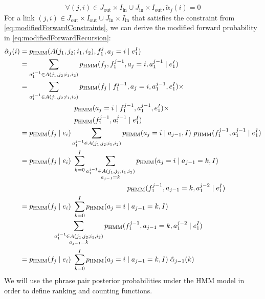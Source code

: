 %
\begin{equation}
  \forall (j, i) \in J_{\text{out}} \times I_{\text{in}} \cup J_{\text{in}} \times I_{\text{out}}, \tilde \alpha_j(i) = 0
  \label{eq:modifiedForwardConstraints}
\end{equation}
%
For a link $(j, i) \in J_{\text{out}} \times I_{\text{out}} \cup J_{\text{in}} \times I_{\text{in}}$ that satisfies the constraint from
\autoref{eq:modifiedForwardConstraints}, we can derive the modified
forward probability in \autoref{eq:modifiedForwardRecursion}:
%
\begin{align}
  \tilde{\alpha}_j(i) &= p_{\text{HMM}}(A(j_1, j_2; i_1, i_2), f_1^j, a_j=i \mid e_1^I) \nonumber \\
                      &= \sum_{a_1^{j-1} \in A(j_1, j_2; i_1, i_2)}
                         p_{\text{HMM}}(f_j, f_1^{j-1},  a_j=i, a_1^{j-1} \mid e_1^I) \nonumber \\
                      &= \sum_{a_1^{j-1} \in A(j_1, j_2; i_1, i_2)}
                         p_{\text{HMM}}(f_j \mid f_1^{j-1},  a_j=i, a_1^{j-1}, e_1^I) \times \nonumber \\
                      & \hspace{7.7em} p_{\text{HMM}}(a_j=i \mid f_1^{j-1}, a_1^{j-1}, e_1^I) \times \nonumber \\
                      & \hspace{7.7em} p_{\text{HMM}}(f_1^{j-1}, a_1^{j-1} \mid e_1^I) \nonumber \\
                      &= p_{\text{HMM}}( f_j \mid e_i ) 
                         \sum_{a_1^{j-1} \in A(j_1, j_2; i_1, i_2)}
                         p_{\text{HMM}}(a_j=i \mid a_{j-1}, I) \
                         p_{\text{HMM}}(f_1^{j-1},  a_1^{j-1} \mid e_1^I) \nonumber \\
                      &= p_{\text{HMM}}(f_j \mid e_i) \
                         \sum_{k=0}^I \sum_{\substack{a_1^{j-1} \in A(j_1, j_2; i_1, i_2) \\ a_{j-1} = k}}
                         p_{\text{HMM}}(a_j=i \mid a_{j-1} = k, I) \nonumber \\
                      & \hspace{15.2em} p_{\text{HMM}}(f_1^{j-1},  a_{j-1} = k,  a_1^{j-2} \mid e_1^I) \nonumber \\
                      &= p_{\text{HMM}}(f_j \mid e_i) \
                         \sum_{k = 0}^I
                         p_{\text{HMM}}(a_j = i \mid a_{j-1} = k, I) \nonumber \\
                      & \hspace{4.7em} \sum_{\substack{a_1^{j-1} \in A(j_1, j_2; i_1, i_2) \\ a_{j-1} = k}}
                         p_{\text{HMM}}(f_1^{j-1},  a_{j-1} = k,  a_1^{j-2} \mid e_1^I) \nonumber \\
                      &= p_{\text{HMM}}(f_j \mid e_i) \
                         \sum_{k = 0}^I
                         p_{\text{HMM}}(a_j=i \mid a_{j-1} = k, I) \; \tilde \alpha_{j-1}(k)
                         \label{eq:modifiedForwardRecursion}
\end{align}
%
We will use the phrase pair posterior probabilities under the HMM model
in order to define ranking and counting functions.

